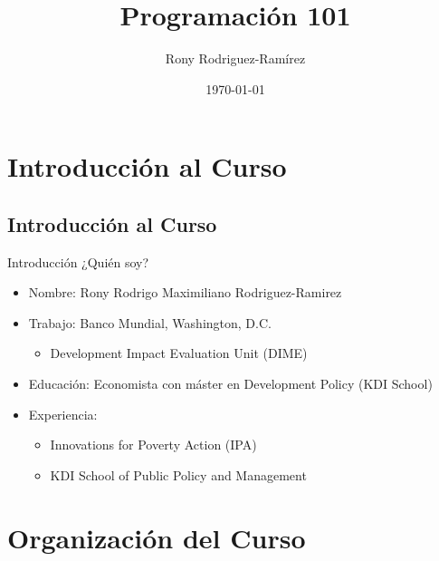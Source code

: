 \documentclass[11pt, aspectratio=169, compress]{beamer}
\title{Programación 101}
\author{Rony Rodriguez-Ramírez}
\institute{LAMBDA}
\date{\today}
\begin{document}
	
\begin{frame}[plain]
	\maketitle 
\end{frame}

\section{Introducción al Curso}
\subsection{Introducción al Curso}
\begin{frame}{Introducción}
	¿Quién soy? 
	\begin{itemize}
		\item Nombre: Rony Rodrigo Maximiliano Rodriguez-Ramirez
		\item Trabajo: Banco Mundial, Washington, D.C.  
		\begin{itemize}
			\item Development Impact Evaluation Unit (DIME)
		\end{itemize}
		\item Educación: Economista con máster en Development Policy (KDI School)
		\item Experiencia: 
		\begin{itemize}
			\item Innovations for Poverty Action (IPA)
			\item KDI School of Public Policy and Management
		\end{itemize} 
	\end{itemize}
\end{frame}
\section{Organización del Curso}
\end{document}
